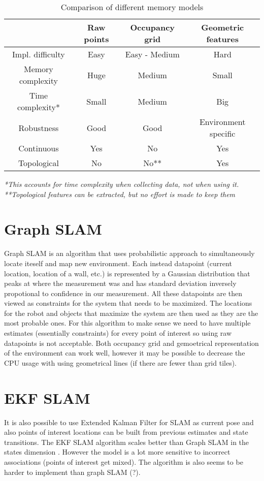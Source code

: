 \documentclass[12pt, a4paper, onecolumn]{article}
\begin{document}
\begin{table}[h!]
  \begin{center}
    \begin{tabular}[c]{|c | c c c|}
      \hline
       & Raw points & Occupancy grid & Geometric features \\
      \hline
      Impl. difficulty & Easy & Easy - Medium & Hard \\
      \hline
      Memory complexity & Huge & Medium & Small \\
      \hline
      Time complexity* & Small & Medium & Big \\
      \hline
      Robustness & Good & Good & Environment specific \\
      \hline
      Continuous & Yes & No & Yes \\
      \hline
      Topological & No & No** & Yes \\
      \hline
    \end{tabular}
  \end{center}
  \caption{Comparison of different memory models}
  \label{tab:memory_models}
\end{table}
\textit{*This accounts for time complexity when collecting data, not when using it.} \\
\textit{**Topological features can be extracted, but no effort is made to keep them}

\section{Graph SLAM}
Graph SLAM is an algorithm that uses probabilistic approach to simultaneously locate iteself and map new environment.
Each instead datapoint (current location, location of a wall, etc.) is represented by a Gaussian distribution that peaks at where the measurement was
and has standard deviation inversely propotional to confidence in our measurement.
All these datapoints are then viewed as constraints for the system that needs to be maximized.
The locations for the robot and objects that maximize the system are then used as they are the most probable ones.
For this algorithm to make sense we need to have multiple estimates (essentially constraints) for every point of interest so using raw datapoints is not acceptable.
Both occupancy grid and gemoetrical representation of the environment can work well, however it may be possible to decrease the CPU usage with using geometrical lines (if there are fewer than grid tiles).

\section{EKF SLAM}
It is also possible to use Extended Kalman Filter for SLAM as current pose and also points of interest locations can be built from previous estimates and state transitions.
The EKF SLAM algorithm scales better than Graph SLAM in the states dimension \cite{EKFSLAM}. 
However the model is a lot more sensitive to incorrect associations (points of interest get mixed).
The algorithm is also seems to be harder to implement than graph SLAM (?). 
\end{document}
